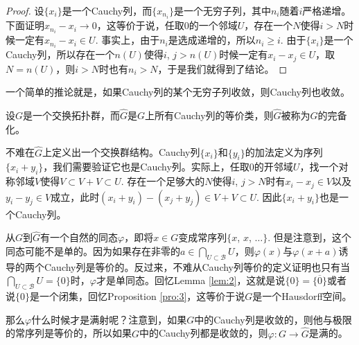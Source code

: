 \begin{proof}
	设$\{x_i\}$是一个Cauchy列，而$\{x_{n_i}\}$是一个无穷子列，其中$n_i$随着$i$严格递增。下面证明$x_{n_i}-x_i\to 0$，这等价于说，任取$0$的一个邻域$U$，存在一个$N$使得$i>N$时候一定有$x_{n_i}-x_{i}\in U$. 事实上，由于$n_i$是选成递增的，所以$n_i\geq i$. 由于$\{x_i\}$是一个Cauchy列，所以存在一个$n(U)$使得$i$, $j>n(U)$时候一定有$x_i-x_j\in U$，取$N=n(U)$，则$i>N$时也有$n_i>N$，于是我们就得到了结论。
\end{proof}

一个简单的推论就是，如果Cauchy列的某个无穷子列收敛，则Cauchy列也收敛。

\begin{para}
	设$G$是一个交换拓扑群，而$\hat G$是$G$上所有Cauchy列的等价类，则$\hat G$被称为$G$的完备化。

	不难在$\hat G$上定义出一个交换群结构。Cauchy列$\{x_i\}$和$\{y_i\}$的加法定义为序列$\{x_i+y_i\}$，我们需要验证它也是Cauchy列。实际上，任取$0$的开邻域$U$，找一个对称邻域$V$使得$V\subset V+V\subset U$. 存在一个足够大的$N$使得$i$, $j>N$时有$x_i-x_j\in V$以及$y_i-y_j\in V$成立，此时$(x_i+y_i)-(x_j+y_j)\in V+V\subset U$. 因此$\{x_i+y_i\}$也是一个Cauchy列。

	从$G$到$\hat G$有一个自然的同态$\varphi$，即将$x\in G$变成常序列$\{x$, $x$, $\dots\}$. 但是注意到，这个同态可能不是单的。因为如果存在非零的$a\in\bigcap_{U\subset \mathscr{B}}U$，则$\varphi(x)$与$\varphi(x+a)$诱导的两个Cauchy列是等价的。反过来，不难从Cauchy列等价的定义证明也只有当$\bigcap_{U\subset \mathscr{B}}U=\{0\}$时，$\varphi$才是单同态。回忆Lemma \ref{lem:2}，这就是说$\{0\}=\overline{\{0\}}$或者说$\{0\}$是一个闭集，回忆Proposition \ref{pro:3}，这等价于说$G$是一个Hausdorff空间。

	那么$\varphi$什么时候才是满射呢？注意到，如果$G$中的Cauchy列是收敛的，则他与极限的常序列是等价的，所以如果$G$中的Cauchy列都是收敛的，则$\varphi:G\to \hat{G}$是满的。
\end{para}

